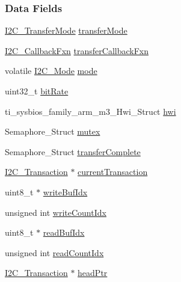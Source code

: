 \subsubsection*{Data Fields}
\begin{DoxyCompactItemize}
\item 
\hyperlink{_i2_c_8h_a39f3b9340fc4ee241b0d2da9b2841c26}{I2\-C\-\_\-\-Transfer\-Mode} \hyperlink{struct_i2_c_c_c26_x_x___object_a64cd64cf328013bebacf75feaa17f127}{transfer\-Mode}
\item 
\hyperlink{_i2_c_8h_a5ece918abf136397f682df3924441634}{I2\-C\-\_\-\-Callback\-Fxn} \hyperlink{struct_i2_c_c_c26_x_x___object_ad8faa83bb84c09307294134d9fd9d454}{transfer\-Callback\-Fxn}
\item 
volatile \hyperlink{_i2_c_8h_ac8f0941a68f18f5d1743a21ab32c7929}{I2\-C\-\_\-\-Mode} \hyperlink{struct_i2_c_c_c26_x_x___object_aee0e8b289fcfc23935b009a4d1f54201}{mode}
\item 
uint32\-\_\-t \hyperlink{struct_i2_c_c_c26_x_x___object_a8544e07d83b25c67b957c58a9a0e4317}{bit\-Rate}
\item 
ti\-\_\-sysbios\-\_\-family\-\_\-arm\-\_\-m3\-\_\-\-Hwi\-\_\-\-Struct \hyperlink{struct_i2_c_c_c26_x_x___object_a759e20bc1c388f73638963c20d99cd09}{hwi}
\item 
Semaphore\-\_\-\-Struct \hyperlink{struct_i2_c_c_c26_x_x___object_a84660b6df95d3cad705c774609f4e29f}{mutex}
\item 
Semaphore\-\_\-\-Struct \hyperlink{struct_i2_c_c_c26_x_x___object_a98865f00b814edcc3480e64e55f8405d}{transfer\-Complete}
\item 
\hyperlink{struct_i2_c___transaction}{I2\-C\-\_\-\-Transaction} $\ast$ \hyperlink{struct_i2_c_c_c26_x_x___object_aa14b9975af2982d7c84646b91c1a6ad5}{current\-Transaction}
\item 
uint8\-\_\-t $\ast$ \hyperlink{struct_i2_c_c_c26_x_x___object_a8175be0691405f4398d2734492e534ed}{write\-Buf\-Idx}
\item 
unsigned int \hyperlink{struct_i2_c_c_c26_x_x___object_a8b01e2705b597bc44164bafa3a14af6e}{write\-Count\-Idx}
\item 
uint8\-\_\-t $\ast$ \hyperlink{struct_i2_c_c_c26_x_x___object_ad39b7ffb7de097aecda32d14005df8cd}{read\-Buf\-Idx}
\item 
unsigned int \hyperlink{struct_i2_c_c_c26_x_x___object_a012990d843f7189a488e072708bb4490}{read\-Count\-Idx}
\item 
\hyperlink{struct_i2_c___transaction}{I2\-C\-\_\-\-Transaction} $\ast$ \hyperlink{struct_i2_c_c_c26_x_x___object_a7148eed6e39ab2ab626c53030c7b77bb}{head\-Ptr}

\end{DoxyCompactItemize}
